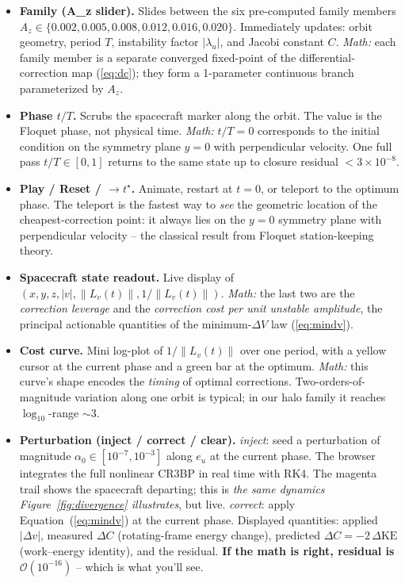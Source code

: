 \documentclass[11pt,a4paper]{article}
\begin{document}
\begin{itemize}[leftmargin=*]
  \item \textbf{Family (A\_z slider).}
    Slides between the six pre-computed family members $A_z \in \{0.002, 0.005, 0.008, 0.012, 0.016, 0.020\}$. Immediately updates: orbit geometry, period $T$, instability factor $|\lambda_u|$, and Jacobi constant $C$. \textit{Math:} each family member is a separate converged fixed-point of the differential-correction map (\ref{eq:dc}); they form a 1-parameter continuous branch parameterized by $A_z$.

  \item \textbf{Phase $t/T$.}
    Scrubs the spacecraft marker along the orbit. The value is the Floquet phase, not physical time. \textit{Math:} $t/T = 0$ corresponds to the initial condition on the symmetry plane $y=0$ with perpendicular velocity. One full pass $t/T \in [0,1]$ returns to the same state up to closure residual $< 3\times 10^{-8}$.

  \item \textbf{Play / Reset / $\to t^\star$.}
    Animate, restart at $t=0$, or teleport to the optimum phase. The teleport is the fastest way to \emph{see} the geometric location of the cheapest-correction point: it always lies on the $y=0$ symmetry plane with perpendicular velocity -- the classical result from Floquet station-keeping theory.

  \item \textbf{Spacecraft state readout.}
    Live display of $(x, y, z, |v|, \|L_v(t)\|, 1/\|L_v(t)\|)$. \textit{Math:} the last two are the \emph{correction leverage} and the \emph{correction cost per unit unstable amplitude}, the principal actionable quantities of the minimum-$\Delta V$ law (\ref{eq:mindv}).

  \item \textbf{Cost curve.}
    Mini log-plot of $1/\|L_v(t)\|$ over one period, with a yellow cursor at the current phase and a green bar at the optimum. \textit{Math:} this curve's shape encodes the \emph{timing} of optimal corrections. Two-orders-of-magnitude variation along one orbit is typical; in our halo family it reaches $\log_{10}$-range $\sim 3$.

  \item \textbf{Perturbation (inject / correct / clear).}
    \emph{inject}: seed a perturbation of magnitude $\alpha_0 \in [10^{-7}, 10^{-3}]$ along $e_u$ at the current phase. The browser integrates the full nonlinear CR3BP in real time with RK4. The magenta trail shows the spacecraft departing; this is \emph{the same dynamics Figure~\ref{fig:divergence} illustrates}, but live.
    \emph{correct}: apply Equation~(\ref{eq:mindv}) at the current phase. Displayed quantities: applied $|\Delta v|$, measured $\Delta C$ (rotating-frame energy change), predicted $\Delta C = -2\,\Delta\mathrm{KE}$ (work--energy identity), and the residual. \textbf{If the math is right, residual is $\mathcal{O}(10^{-16})$} -- which is what you'll see.


\end{itemize}
\end{document}
